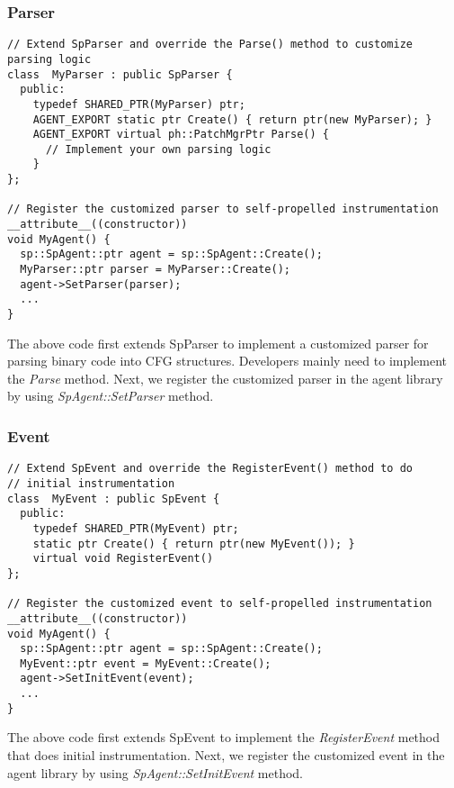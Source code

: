 \subsubsection{Parser}
\lstset{numbers=left}
\begin{lstlisting}[caption=Use customized parser]
// Extend SpParser and override the Parse() method to customize parsing logic
class  MyParser : public SpParser {
  public:
    typedef SHARED_PTR(MyParser) ptr;
    AGENT_EXPORT static ptr Create() { return ptr(new MyParser); }
    AGENT_EXPORT virtual ph::PatchMgrPtr Parse() {
      // Implement your own parsing logic
    }
};

// Register the customized parser to self-propelled instrumentation
__attribute__((constructor))
void MyAgent() {
  sp::SpAgent::ptr agent = sp::SpAgent::Create();
  MyParser::ptr parser = MyParser::Create();
  agent->SetParser(parser);
  ...
}
\end{lstlisting}
The above code first extends SpParser to implement a customized parser for
parsing binary code into CFG structures. Developers mainly need to implement the
{\em Parse} method. Next, we register the customized parser in the agent library
by using {\em SpAgent::SetParser} method.

\subsubsection{Event}
\lstset{numbers=left}
\begin{lstlisting}[caption=Use customized event]
// Extend SpEvent and override the RegisterEvent() method to do 
// initial instrumentation
class  MyEvent : public SpEvent {
  public:
    typedef SHARED_PTR(MyEvent) ptr;
    static ptr Create() { return ptr(new MyEvent()); }
    virtual void RegisterEvent()
};

// Register the customized event to self-propelled instrumentation
__attribute__((constructor))
void MyAgent() {
  sp::SpAgent::ptr agent = sp::SpAgent::Create();
  MyEvent::ptr event = MyEvent::Create();
  agent->SetInitEvent(event);
  ...
}
\end{lstlisting}
The above code first extends SpEvent to implement the {\em RegisterEvent} method
that does initial instrumentation. Next, we register the customized event in
the agent library by using {\em SpAgent::SetInitEvent} method.

